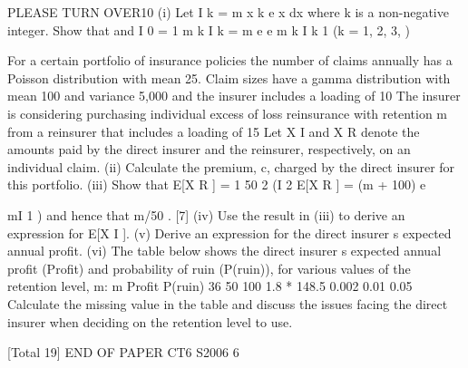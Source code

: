 \documentclass[a4paper,12pt]{article}
\begin{document}
 

PLEASE TURN OVER10
(i)
Let I k =
m
x k e
x
dx
where k is a non-negative integer.
Show that
and
I 0 =
1
m k
I k =
m
e
e
m
k
I k
1
(k = 1, 2, 3,
)

For a certain portfolio of insurance policies the number of claims annually has a
Poisson distribution with mean 25. Claim sizes have a gamma distribution with mean
100 and variance 5,000 and the insurer includes a loading of 10%
The insurer is considering purchasing individual excess of loss reinsurance with
retention m from a reinsurer that includes a loading of 15%
Let X I and X R denote the amounts paid by the direct insurer and the reinsurer,
respectively, on an individual claim.
(ii) Calculate the premium, c, charged by the direct insurer for this portfolio.
(iii) Show that E[X R ] =
1
50 2
(I 2
E[X R ] = (m + 100) e

mI 1 ) and hence that
m/50 .
[7]
(iv) Use the result in (iii) to derive an expression for E[X I ]. 
(v) Derive an expression for the direct insurer s expected annual profit. 
(vi) The table below shows the direct insurer s expected annual profit (Profit) and
probability of ruin (P(ruin)), for various values of the retention level, m:
m Profit P(ruin)
36
50
100 1.8
*
148.5 0.002
0.01
0.05
Calculate the missing value in the table and discuss the issues facing the direct
insurer when deciding on the retention level to use.

[Total 19]
END OF PAPER
CT6 S2006
6

\end{document}
